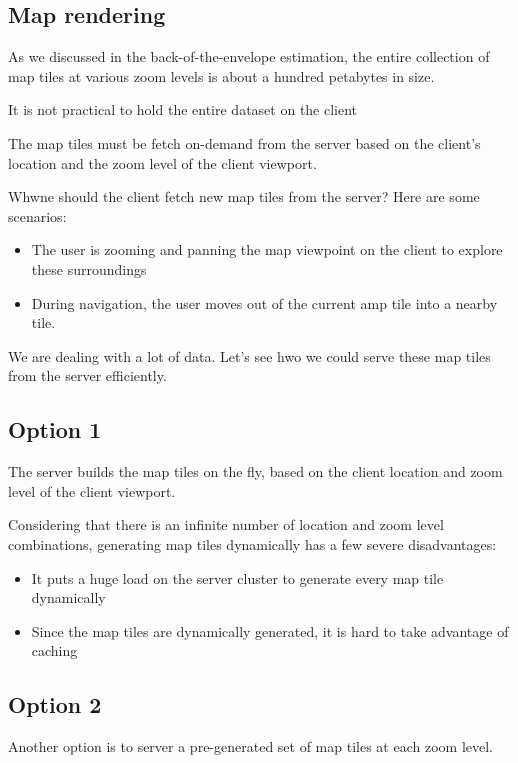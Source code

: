 \documentclass{report}
\theoremstyle{definition}
\let\oldsubsection\subsection
\renewcommand{\subsection}{\oldsubsection*}
\begin{document}
\subsection{Map rendering}

As we discussed in the back-of-the-envelope estimation, the entire collection of map tiles at various zoom levels is about a hundred
petabytes in size.

It is not practical to hold the entire dataset on the client

The map tiles must be fetch on-demand from the server based on the client's location and the zoom level of the client viewport.

Whwne should the client fetch new map tiles from the server? Here are some scenarios:

\begin{itemize}
\item
The user is zooming and panning the map viewpoint on the client to explore these surroundings
\item
During navigation, the user moves out of the current amp tile into a nearby tile.
\end{itemize}

We are dealing with a lot of data. Let's see hwo we could serve these map tiles from the server efficiently.

\subsection{Option 1}

The server builds the map tiles on the fly, based on the client location and zoom level of the client viewport.

Considering that there is an infinite number of location and zoom level combinations, generating map tiles dynamically has a few severe disadvantages:

\begin{itemize}
\item
It puts a huge load on the server cluster to generate every map tile dynamically
\item
Since the map tiles are dynamically generated, it is hard to take advantage of caching
\end{itemize}

\subsection{Option 2}

Another option is to server a pre-generated set of map tiles at each zoom level.
\end{document}
